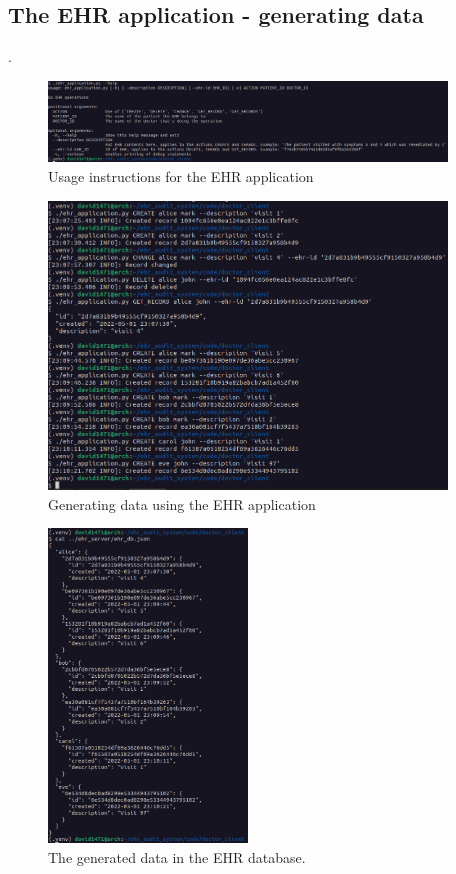 \documentclass[11pt]{article}
\begin{document}
\begin{flushleft}
\subsection{The EHR application - generating data}
.

\begin{figure}[h!]
	\begin{center}
		\includegraphics[width = 400px]{images/ehr_application_help.png}
		\caption{Usage instructions for the EHR application}
	\end{center}
\end{figure}

\begin{figure}[h!]
\begin{center}
	\includegraphics[width = 400px]{images/generating_data.png}
	\caption{Generating data using the EHR application}
\end{center}
\end{figure}

\begin{figure}[h!]
\begin{center}
	\includegraphics[width = 200px]{images/ehr_db_generated.png}
	\caption{The generated data in the EHR database.}
\end{center}
\end{figure}


\end{flushleft}
\end{document}
